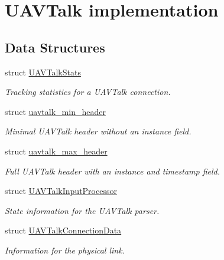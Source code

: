 \hypertarget{group___u_a_v_talk}{\section{\-U\-A\-V\-Talk implementation}
\label{group___u_a_v_talk}
}
\subsection*{\-Data \-Structures}
\begin{DoxyCompactItemize}
\item 
struct \hyperlink{struct_u_a_v_talk_stats}{\-U\-A\-V\-Talk\-Stats}
\begin{DoxyCompactList}\small\item\em \-Tracking statistics for a \-U\-A\-V\-Talk connection. \end{DoxyCompactList}\item 
struct \hyperlink{structuavtalk__min__header}{uavtalk\-\_\-min\-\_\-header}
\begin{DoxyCompactList}\small\item\em \-Minimal \-U\-A\-V\-Talk header without an instance field. \end{DoxyCompactList}\item 
struct \hyperlink{structuavtalk__max__header}{uavtalk\-\_\-max\-\_\-header}
\begin{DoxyCompactList}\small\item\em \-Full \-U\-A\-V\-Talk header with an instance and timestamp field. \end{DoxyCompactList}\item 
struct \hyperlink{struct_u_a_v_talk_input_processor}{\-U\-A\-V\-Talk\-Input\-Processor}
\begin{DoxyCompactList}\small\item\em \-State information for the \-U\-A\-V\-Talk parser. \end{DoxyCompactList}\item 
struct \hyperlink{struct_u_a_v_talk_connection_data}{\-U\-A\-V\-Talk\-Connection\-Data}
\begin{DoxyCompactList}\small\item\em \-Information for the physical link. \end{DoxyCompactList}\end{DoxyCompactItemize}
